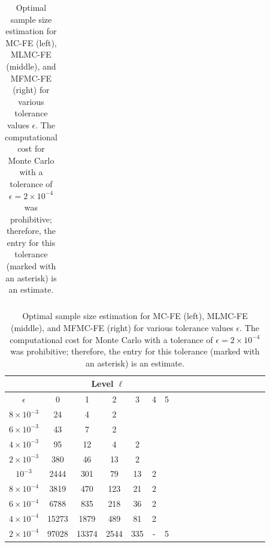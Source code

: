 \begin{table}[ht]
{\begin{tabular}{c|c|c|c|c|c|c|c|c|c|c|c|c|}
			\hline
	\end{tabular}
 \qquad
		\begin{tabular}{c|c|c|c|c|c|c|c|c|c|c|c|c|c|c|c|c|c|}
	    \cline{2-7}	
		&\multicolumn{6}{|c|}{ Level $\ell$}\\
			\hline
			\multicolumn{1}{|c|}{$\epsilon$}&0&1&2&3&4&5\\
			\hline
			\multicolumn{1}{|c|}{$8\times 10^{-3} $}&24&4&2&&&\\
			\multicolumn{1}{|c|}{$6\times 10^{-3} $}&43&7&2&&&\\
			\multicolumn{1}{|c|}{$4\times 10^{-3} $}&95&12&4&2&&\\
			\multicolumn{1}{|c|}{$2\times 10^{-3} $}&380&46&13&2&&\\
			\multicolumn{1}{|c|}{$10^{-3} $}&2444&301&79&13&2&\\
			\multicolumn{1}{|c|}{$8\times 10^{-4} $}&3819&470&123&21&2&\\
                \multicolumn{1}{|c|}{$6\times 10^{-4} $}&6788&835&218&36&2&\\
			\multicolumn{1}{|c|}{$4\times 10^{-4} $}&15273&1879&489&81&2&\\
                \multicolumn{1}{|c|}{$2\times 10^{-4} $}&97028&13374&2544&335&-&5\\
			\hline
	\end{tabular}
 
 }
	\caption{Optimal sample size estimation for MC-FE (left), MLMC-FE (middle), and MFMC-FE (right) for various tolerance values $\epsilon$. The computational cost for Monte Carlo with a tolerance of $\epsilon = 2\times 10^{-4}$ was prohibitive; therefore, the entry for this tolerance (marked with an asterisk) is an estimate.}
	\label{Tab:SampleSize}
\end{table}
%










